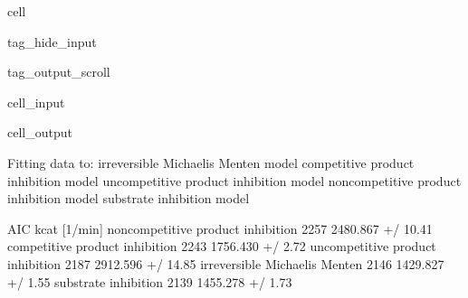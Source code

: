 \documentclass[letterpaper,10pt,english]{jupyterBook}
\begin{document}
\begin{sphinxuseclass}{cell}
\begin{sphinxuseclass}{tag_hide_input}
\begin{sphinxuseclass}{tag_output_scroll}\begin{sphinxVerbatimInput}

\begin{sphinxuseclass}{cell_input}
\begin{sphinxVerbatim}[commandchars=\\\{\}]
  \PYG{p}{[}\PYG{p}{]}
   
        
\end{sphinxVerbatim}

\end{sphinxuseclass}\end{sphinxVerbatimInput}
\begin{sphinxVerbatimOutput}

\begin{sphinxuseclass}{cell_output}
\begin{sphinxVerbatim}[commandchars=\\\{\}]
Fitting data to:
 \PYGZhy{} irreversible Michaelis Menten model
 \PYGZhy{} competitive product inhibition model
 \PYGZhy{} uncompetitive product inhibition model
 \PYGZhy{} non\PYGZhy{}competitive product inhibition model
 \PYGZhy{} substrate inhibition model
\end{sphinxVerbatim}

\begin{sphinxVerbatim}[commandchars=\\\{\}]
                                     AIC         kcat [1/min]  \PYGZbs{}
non\PYGZhy{}competitive product inhibition \PYGZhy{}2257  2480.867 +/\PYGZhy{} 10.41\PYGZpc{}   
competitive product inhibition     \PYGZhy{}2243   1756.430 +/\PYGZhy{} 2.72\PYGZpc{}   
uncompetitive product inhibition   \PYGZhy{}2187  2912.596 +/\PYGZhy{} 14.85\PYGZpc{}   
irreversible Michaelis Menten      \PYGZhy{}2146   1429.827 +/\PYGZhy{} 1.55\PYGZpc{}   
substrate inhibition               \PYGZhy{}2139   1455.278 +/\PYGZhy{} 1.73\PYGZpc{}   


\end{sphinxVerbatim}
\end{sphinxuseclass}
\end{sphinxVerbatimOutput}
\end{sphinxuseclass}
\end{sphinxuseclass}
\end{sphinxuseclass}
\end{document}
